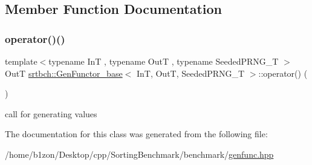 \subsection{Member Function Documentation}
\mbox{\label{classsrtbch_1_1GenFunctor__base_a3d2458d897cc2eff6f0206241afec80b}} 
\subsubsection{\texorpdfstring{operator()()}{operator()()}}
{\footnotesize\ttfamily template$<$typename InT , typename OutT , typename Seeded\+P\+R\+N\+G\+\_\+T $>$ \\
OutT \hyperlink{classsrtbch_1_1GenFunctor__base}{srtbch\+::\+Gen\+Functor\+\_\+base}$<$ InT, OutT, Seeded\+P\+R\+N\+G\+\_\+T $>$\+::operator() (\begin{DoxyParamCaption}{ }\end{DoxyParamCaption})\hspace{0.3cm}{\ttfamily [inline]}}

call for generating values 

The documentation for this class was generated from the following file\+:\begin{DoxyCompactItemize}
\item 
/home/b1zon/\+Desktop/cpp/\+Sorting\+Benchmark/benchmark/\hyperlink{genfunc_8hpp}{genfunc.\+hpp}\end{DoxyCompactItemize}
